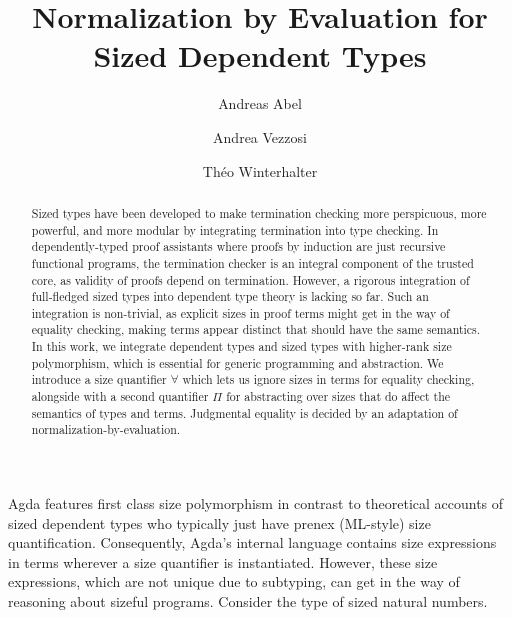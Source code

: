 \documentclass[a4paper]{easychair}
\title{Normalization by Evaluation for Sized Dependent Types}
\author{
  Andreas Abel\inst{1}
  \and
  Andrea Vezzosi\inst{1}
  \and
  Th\'{e}o Winterhalter\inst{2}
}
\institute{
  Department of Computer Science and Eng., Gothenburg
  University, Sweden \\
  \texttt{\{abela,vezzosi\}@chalmers.se}
  \and
  \' Ecole Normale Supérieure de Cachan, France \\
  \texttt{theo.winterhalter@ens-cachan.fr}
}
\begin{document}
\maketitle

\begin{abstract}
Sized types have been developed to make termination checking more perspicuous, more powerful, and more modular by integrating termination into type checking.  In dependently-typed proof assistants where proofs by induction are just recursive functional programs, the termination checker is an integral component of the trusted core, as validity of proofs depend on termination.  However, a rigorous integration of full-fledged sized types into dependent type theory is lacking so far.  Such an integration is non-trivial, as explicit sizes in proof terms might get in the way of equality checking, making terms appear distinct that should have the same semantics.
%
In this work, we integrate dependent types and sized types with
higher-rank size polymorphism, which is essential for generic
programming and abstraction.  We introduce a size quantifier $\forall$
which lets us ignore sizes in terms for equality checking, alongside
with a second quantifier $\Pi$ for abstracting over sizes that do
affect the semantics of types and terms.  Judgmental equality is
decided by an adaptation of normalization-by-evaluation. %
\end{abstract}


\medskip

Agda \cite{agdawiki} features first class size polymorphism
\cite{abel:fics12} in contrast to theoretical accounts of sized
dependent types
\cite{bartheGregoirePastawski:lpar06,blanqui:rta04,sacchini:lics13}
who typically just have prenex (ML-style) size quantification.
Consequently, Agda's internal language contains size expressions in
terms wherever a size quantifier is instantiated.  However, these
size expressions, which are not unique due to subtyping, can get in
the way of reasoning about sizeful programs.
Consider the type of sized natural numbers.



\end{document}
